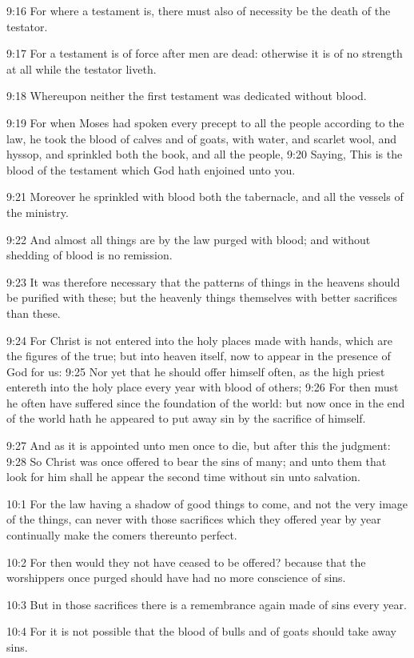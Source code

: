 9:16 For where a testament is, there must also of necessity be the
death of the testator.

9:17 For a testament is of force after men are dead: otherwise it is
of no strength at all while the testator liveth.

9:18 Whereupon neither the first testament was dedicated without
blood.

9:19 For when Moses had spoken every precept to all the people
according to the law, he took the blood of calves and of goats, with
water, and scarlet wool, and hyssop, and sprinkled both the book, and
all the people, 9:20 Saying, This is the blood of the testament which
God hath enjoined unto you.

9:21 Moreover he sprinkled with blood both the tabernacle, and all the
vessels of the ministry.

9:22 And almost all things are by the law purged with blood; and
without shedding of blood is no remission.

9:23 It was therefore necessary that the patterns of things in the
heavens should be purified with these; but the heavenly things
themselves with better sacrifices than these.

9:24 For Christ is not entered into the holy places made with hands,
which are the figures of the true; but into heaven itself, now to
appear in the presence of God for us: 9:25 Nor yet that he should
offer himself often, as the high priest entereth into the holy place
every year with blood of others; 9:26 For then must he often have
suffered since the foundation of the world: but now once in the end of
the world hath he appeared to put away sin by the sacrifice of
himself.

9:27 And as it is appointed unto men once to die, but after this the
judgment: 9:28 So Christ was once offered to bear the sins of many;
and unto them that look for him shall he appear the second time
without sin unto salvation.

10:1 For the law having a shadow of good things to come, and not the
very image of the things, can never with those sacrifices which they
offered year by year continually make the comers thereunto perfect.

10:2 For then would they not have ceased to be offered? because that
the worshippers once purged should have had no more conscience of
sins.

10:3 But in those sacrifices there is a remembrance again made of sins
every year.

10:4 For it is not possible that the blood of bulls and of goats
should take away sins.

